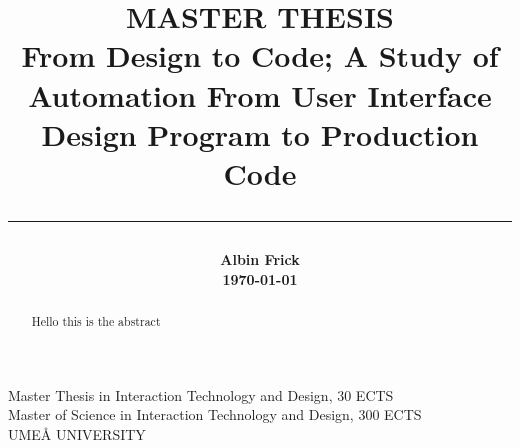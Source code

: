 \title{
    \Large MASTER THESIS\\
    \vspace{5mm}
    \huge \bf
        From Design to Code; A Study of Automation From User Interface Design Program to Production Code\\
        \noindent\rule{\textwidth}{0.4pt}

}

\date{} %
\author{
    \LARGE\bf{Albin Frick}\\
    \today
}

\maketitle
\vspace*{\fill}
\begin{center}
Master Thesis in Interaction Technology and Design, 30 ECTS\\
Master of Science in Interaction Technology and Design, 300 ECTS\\
UMEÅ UNIVERSITY
\end{center}
\newpage
\tableofcontents
\newpage
{}
\begin{abstract}
   Hello this is the abstract 
\end{abstract}
\newpage
